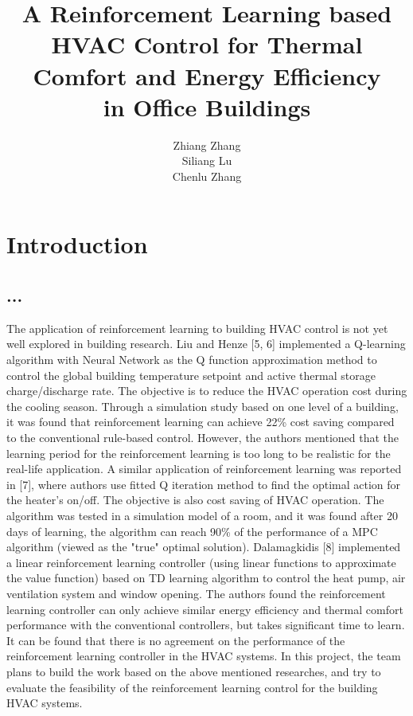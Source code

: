 \documentclass{article}
\title{A Reinforcement Learning based HVAC Control for Thermal Comfort and Energy Efficiency \\in Office Buildings
}
\author{
  Zhiang Zhang\\
  \And 
  Siliang Lu\\
  \And 
  Chenlu Zhang\\
}
\begin{document}

\maketitle


\section{Introduction}
\subsection{...}
The application of reinforcement learning to building HVAC control is not yet well explored in building research. Liu and Henze [5, 6] implemented a Q-learning algorithm with Neural Network as the Q function approximation method to control the global building temperature setpoint and active thermal storage charge/discharge rate. The objective is to reduce the HVAC operation cost during the cooling season. Through a simulation study based on one level of a building, it was found that reinforcement learning can achieve 22\% cost saving compared to the conventional rule-based control. However, the authors mentioned that the learning period for the reinforcement learning is too long to be realistic for the real-life application. A similar application of reinforcement learning was reported in [7], where authors use fitted Q iteration method to find the optimal action for the heater's on/off. The objective is also cost saving of HVAC operation. The algorithm was tested in a simulation model of a room, and it was found after 20 days of learning, the algorithm can reach 90\% of the performance of a MPC algorithm (viewed as the "true" optimal solution). Dalamagkidis [8] implemented a linear reinforcement learning controller (using linear functions to approximate the value function) based on TD learning algorithm to control the heat pump, air ventilation system and window opening. The authors found the reinforcement learning controller can only achieve similar energy efficiency and thermal comfort performance with the conventional controllers, but takes significant time to learn. It can be found that there is no agreement on the performance of the reinforcement learning controller in the HVAC systems. In this project, the team plans to build the work based on the above mentioned researches, and try to evaluate the feasibility of the reinforcement learning control for the building HVAC systems. 
\end{document}
